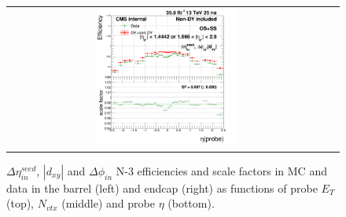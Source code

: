 \begin{figure}[bh]
\begin{center}
\begin{tabular}{cc}
      \includegraphics[width=0.45\textwidth]{figures/Zprime/2016/ScaleFactor/SameSign/N_1_eff/g_compare_cut_eta_Barrel+Endcap_ea_ta_inc_AS_N_3_Trk_PUW.png}
    \end{tabular}
    \caption{$\Delta \eta_{in}^{seed}$, $|d_{xy}|$ and $\Delta \phi_{in}$ N-3 efficiencies and scale factors in MC and data in the barrel (left) and endcap (right) as functions of probe $E_T$ (top), $N_{vtx}$ (middle) and probe $\eta$ (bottom).}
    \label{fig:DetaIn_Dxy_DphiIn_2016}
  \end{center}
\end{figure}

\clearpage
